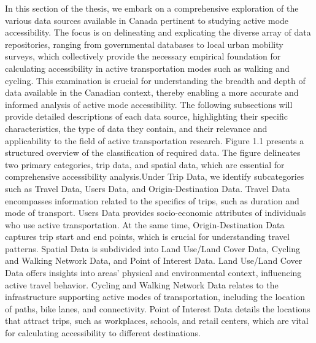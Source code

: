 \documentclass[12pt,twoside]{reedthesis}
\begin{document}
In this section of the thesis, we embark on a comprehensive exploration of the various data sources available in Canada pertinent to studying active mode accessibility. The focus is on delineating and explicating the diverse array of data repositories, ranging from governmental databases to local urban mobility surveys, which collectively provide the necessary empirical foundation for calculating accessibility in active transportation modes such as walking and cycling. This examination is crucial for understanding the breadth and depth of data available in the Canadian context, thereby enabling a more accurate and informed analysis of active mode accessibility. The following subsections will provide detailed descriptions of each data source, highlighting their specific characteristics, the type of data they contain, and their relevance and applicability to the field of active transportation research. Figure 1.1 presents a structured overview of the classification of required data. The figure delineates two primary categories, trip data, and spatial data, which are essential for comprehensive accessibility analysis.Under Trip Data, we identify subcategories such as Travel Data, Users Data, and Origin-Destination Data. Travel Data encompasses information related to the specifics of trips, such as duration and mode of transport. Users Data provides socio-economic attributes of individuals who use active transportation. At the same time, Origin-Destination Data captures trip start and end points, which is crucial for understanding travel patterns. Spatial Data is subdivided into Land Use/Land Cover Data, Cycling and Walking Network Data, and Point of Interest Data. Land Use/Land Cover Data offers insights into areas' physical and environmental context, influencing active travel behavior. Cycling and Walking Network Data relates to the infrastructure supporting active modes of transportation, including the location of paths, bike lanes, and connectivity. Point of Interest Data details the locations that attract trips, such as workplaces, schools, and retail centers, which are vital for calculating accessibility to different destinations.
\end{document}
